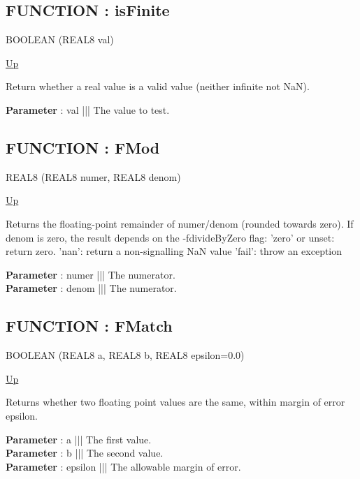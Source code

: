 \subsection*{FUNCTION : isFinite}
\hypertarget{ecldoc:math.isfinite}{}
\par
\begin{minipage}[t]{\textwidth}
\begin{flushleft}
BOOLEAN  (REAL8 val)
\end{flushleft}
\end{minipage}
\hyperlink{ecldoc:Math}{Up} \\
\par
Return whether a real value is a valid value (neither infinite not NaN). \\
\par
\textbf{Parameter} : val ||| The value to test. \\
\subsection*{FUNCTION : FMod}
\hypertarget{ecldoc:math.fmod}{}
\par
\begin{minipage}[t]{\textwidth}
\begin{flushleft}
REAL8  (REAL8 numer, REAL8 denom)
\end{flushleft}
\end{minipage}
\hyperlink{ecldoc:Math}{Up} \\
\par
Returns the floating-point remainder of numer/denom (rounded towards zero). If denom is zero, the result depends on the -fdivideByZero flag: 'zero' or unset: return zero. 'nan': return a non-signalling NaN value 'fail': throw an exception \\
\par
\textbf{Parameter} : numer ||| The numerator. \\
\textbf{Parameter} : denom ||| The numerator. \\
\subsection*{FUNCTION : FMatch}
\hypertarget{ecldoc:math.fmatch}{}
\par
\begin{minipage}[t]{\textwidth}
\begin{flushleft}
BOOLEAN  (REAL8 a, REAL8 b, REAL8 epsilon=0.0)
\end{flushleft}
\end{minipage}
\hyperlink{ecldoc:Math}{Up} \\
\par
Returns whether two floating point values are the same, within margin of error epsilon. \\
\par
\textbf{Parameter} : a ||| The first value. \\
\textbf{Parameter} : b ||| The second value. \\
\textbf{Parameter} : epsilon ||| The allowable margin of error. \\

